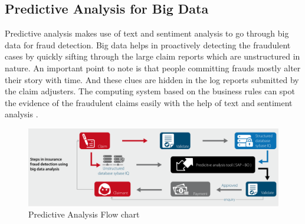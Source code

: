 \documentclass[sigconf]{acmart}
\begin{document}
\subsection{Predictive Analysis for Big Data}
Predictive analysis makes use of text and sentiment analysis to go through big data for fraud detection. Big data helps in proactively detecting the fraudulent cases by quickly sifting through the large claim reports which are unstructured in nature. An important point to note is that people committing frauds mostly alter their story with time. And these clues are hidden in the log reports submitted by the claim adjusters. The computing system based on the business rules can spot the evidence of the fraudulent claims easily with the help of text and sentiment analysis \cite{link7}.
\begin{figure}
  \includegraphics[width=\linewidth]{images/predictive_image1.png}
  \caption{Predictive Analysis Flow chart}
  \label{Figure 2: Predictive Analysis flowchart}
\end{figure}
\end{document}
